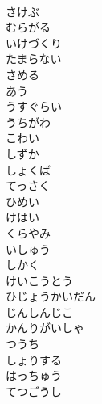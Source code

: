 \documentclass[8pt]{extreport}
\begin{document}
\begin{CJK}{UTF8}{min}
\\	さけぶ
\\	むらがる
\\	いけづくり
\\	たまらない
\\	さめる
\\	あう
\\	うすぐらい
\\	うちがわ
\\	こわい
\\	しずか
\\	しょくば
\\	てっさく
\\	ひめい
\\	けはい
\\	くらやみ
\\	いしゅう
\\	しかく
\\	けいこうとう
\\	ひじょうかいだん
\\	じんしんじこ
\\	かんりがいしゃ
\\	つうち
\\	しょりする
\\	はっちゅう
\\	てつごうし
\end{CJK}
\end{document}
